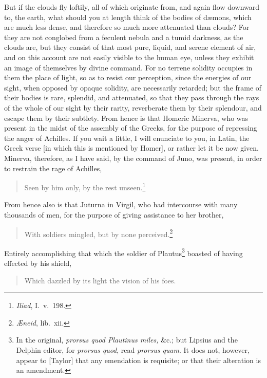 \documentclass{article}
\begin{document}
\noindent But if the clouds fly loftily, all of which originate from, and again
flow downward to, the earth, what should you at length think of the bodies of
d{\ae}mons, which are much less dense, and therefore so much more attenuated
than clouds? For they are not conglobed from a feculent nebula and a tumid
darkness, as the clouds are, but they consist of that most pure, liquid, and
serene element of air, and on this account are not easily visible to the human
eye, unless they exhibit an image of themselves by divine command. For no
terrene solidity occupies in them the place of light, so as to resist our
perception, since the energies of our sight, when opposed by opaque solidity,
are necessarily retarded; but the frame of their bodies is rare, splendid, and
attenuated, so that they pass through the rays of the whole of our sight by
their rarity, reverberate them by their splendour, and escape them by their
subtlety. From hence is that Homeric Minerva, who was present in the midst of
the assembly of the Greeks, for the purpose of repressing the anger of
Achilles. If you wait a little, I will enunciate to you, in Latin, the Greek
verse [in which this is mentioned by Homer], or rather let it be now given.
Minerva, therefore, as I have said, by the command of Juno, was present, in
order to restrain the rage of Achilles,

\begin{verse}
Seen by him only, by the rest unseen.\footnote{\textit{Iliad}, I.~v.~198.}
\end{verse}

\noindent From hence also is that Juturna in Virgil, who had intercourse
with many thousands of men, for the purpose of
giving assistance to her brother,

\begin{verse}
With soldiers mingled, but by none perceived.\footnote{\textit{{\AE}neid},
lib.~xii.}
\end{verse}

\noindent Entirely accomplishing that which the soldier of Plautus\footnote{In
the original, \textit{prorsus quod Plautinus miles,} \&c.; but Lipsius and the
Delphin editor, for \textit{prorsus quod}, read \textit{prorsus quam}. It does
not, however, appear to [Taylor] that any emendation is requisite; or that
their alteration is an amendment.} boasted of having effected by his shield,

\begin{verse}
Which dazzled by its light the vision of his foes.
\end{verse}
\end{document}
